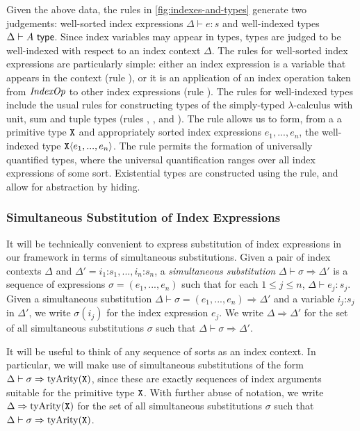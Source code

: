 Given the above data, the rules in \autoref{fig:indexes-and-types}
generate two judgements: well-sorted index expressions $\Delta \vdash
e : s$ and well-indexed types $\Delta \vdash A \textsf{ type}$. Since index
variables may appear in types, types are judged to be well-indexed
with respect to an index context $\Delta$. The rules for well-sorted
index expressions are particularly simple: either an index expression
is a variable that appears in the context (rule ), or it
is an application of an index operation taken from $\mathit{IndexOp}$ to
other index expressions (rule ). The rules for
well-indexed types include the usual rules for constructing types of
the simply-typed $\lambda$-calculus with unit, sum and tuple types
(rules , ,  and
). The rule  allows us to form, from a
a primitive type $\textup{\texttt{X}}$ and appropriately sorted index
expressions $e_1,...,e_n$, the well-indexed type
$\textup{\texttt{X}}\langle e_1,...,e_n \rangle$. The rule  permits the
formation of universally quantified types, where the universal
quantification ranges over all index expressions of some
sort. Existential types are constructed using the 
rule, and allow for abstraction by hiding. %

\subsubsection{Simultaneous Substitution of Index Expressions}
\label{sec:simultaneous-substitution}

It will be technically convenient to express substitution of index
expressions in our framework in terms of simultaneous substitutions.
Given a pair of index contexts $\Delta$ and $\Delta' = i_1 \mathord:
s_1, ..., i_n \mathord: s_n$, a \emph{simultaneous substitution}
$\Delta \vdash \sigma \Rightarrow \Delta'$ is a sequence of
expressions $\sigma = (e_1,...,e_n)$ such that for each $1 \leq j \leq
n$, $\Delta \vdash e_j : s_j$. Given a simultaneous substitution
$\Delta \vdash \sigma = (e_1,...,e_n) \Rightarrow \Delta'$ and a
variable $i_j \mathord: s_j$ in $\Delta'$, we write $\sigma(i_j)$ for
the index expression $e_j$. We write $\Delta \Rightarrow \Delta'$ for
the set of all simultaneous substitutions $\sigma$ such that $\Delta
\vdash \sigma \Rightarrow \Delta'$.

It will be useful to think of any sequence of sorts as an index
context. In particular, we will make use of simultaneous substitutions
of the form $\Delta \vdash \sigma \Rightarrow
\mathrm{tyArity}(\textup{\texttt{X}})$, since these are exactly sequences of
index arguments suitable for the primitive type $\textup{\texttt{X}}$. With
further abuse of notation, we write $\Delta \Rightarrow
\mathrm{tyArity}(\textup{\texttt{X}})$ for the set of all simultaneous
substitutions $\sigma$ such that $\Delta \vdash \sigma \Rightarrow
\mathrm{tyArity}(\textup{\texttt{X}})$.

